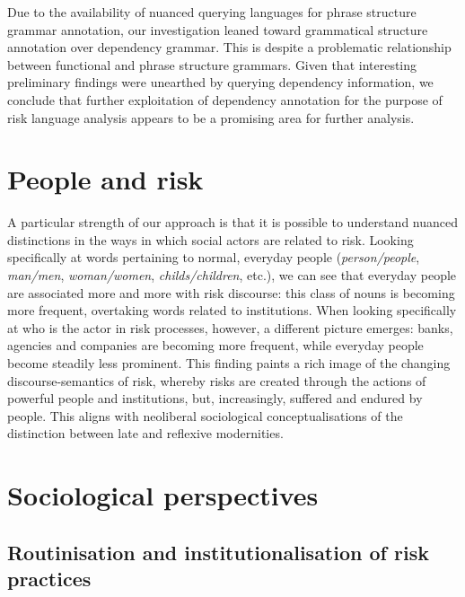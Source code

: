 Due to the availability of nuanced querying languages for phrase structure grammar annotation, our investigation leaned toward grammatical structure annotation over dependency grammar. This is despite a problematic relationship between functional and phrase structure grammars. Given that interesting preliminary findings were unearthed by querying dependency information, we conclude that further exploitation of dependency annotation for the purpose of risk language analysis appears to be a promising area for further analysis.

\section{People and risk}

A particular strength of our approach is that it is possible to understand nuanced distinctions in the ways in which social actors are related to risk. Looking specifically at words pertaining to normal, everyday people (\emph{person\slash people}, \emph{man\slash men}, \emph{woman\slash women}, \emph{childs\slash children}, etc.), we can see that everyday people are associated more and more with risk discourse: this class of nouns is becoming more frequent, overtaking words related to institutions. When looking specifically at who is the actor in risk processes, however, a different picture emerges: banks, agencies and companies are becoming more frequent, while everyday people become steadily less prominent. This finding paints a rich image of the changing discourse-semantics of risk, whereby risks are created through the actions of powerful people and institutions, but, increasingly, suffered and endured by people. This aligns with neoliberal sociological conceptualisations of the distinction between late and reflexive modernities.

\section{Sociological perspectives}

\subsection*{Routinisation and institutionalisation of risk practices}

